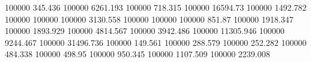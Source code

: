 100000   345.436    %
100000   6261.193   %
100000   718.315    %
100000   16594.73   %
100000   1492.782   %
100000   100000     %
100000   3130.558   %
100000   100000     %
100000   851.87     %
100000   1918.347   %
100000   1893.929   %
100000   4814.567   %
100000   3942.486   %
100000   11305.946  %
100000   9244.467   %
100000   31496.736  %
100000   149.561    %
100000   288.579    %
100000   252.282    %
100000   484.338    %
100000   498.95     %
100000   950.345    %
100000   1107.509   %
100000   2239.008   %

